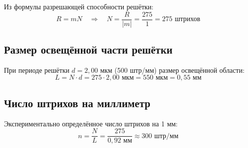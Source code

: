 \documentclass[12pt,a4paper]{article}
\begin{document}
Из формулы разрешающей способности решётки:
\begin{equation}
    R = mN \quad \Rightarrow \quad N = \frac{R}{|m|} = \frac{275}{1} = 275 \text{ штрихов}
\end{equation}

\subsection*{Размер освещённой части решётки}

При периоде решётки $d = 2{,}00$ мкм (500 штр/мм) размер освещённой области:
\begin{equation}
    L = N \cdot d = 275 \cdot 2{,}00\text{ мкм} = 550\text{ мкм} = 0{,}55\text{ мм}
\end{equation}

\subsection*{Число штрихов на миллиметр}

Экспериментально определённое число штрихов на 1 мм:
\begin{equation}
    n = \frac{N}{L} = \frac{275}{0{,}92\text{ мм}} \approx 300 \text{ штр/мм}
\end{equation}




\end{document}
